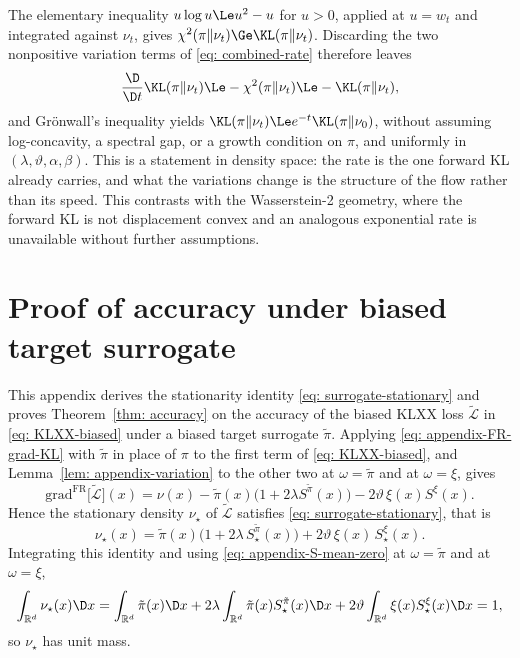 \documentclass{article}
\begin{document}
The elementary inequality $u\log u\Le u^2-u$ for $u>0$, applied at $u=w_t$ and integrated against $\nu_t$, gives $\chi^2(\pi\|\nu_t)\Ge\KL(\pi\|\nu_t)$. Discarding the two nonpositive variation terms of \eqref{eq: combined-rate} therefore leaves
\begin{equation*}
    \frac{\D}{\D t}\KL(\pi\|\nu_t) \Le -\chi^2(\pi\|\nu_t) \Le -\KL(\pi\|\nu_t) ,
\end{equation*}
and Gr\"onwall's inequality yields $\KL(\pi\|\nu_t)\Le e^{-t}\KL(\pi\|\nu_0)$, without assuming log-concavity, a spectral gap, or a growth condition on $\pi$, and uniformly in $(\lambda,\vartheta,\alpha,\beta)$. This is a statement in density space: the rate is the one forward KL already carries, and what the variations change is the structure of the flow rather than its speed. This contrasts with the Wasserstein-2 geometry, where the forward KL is not displacement convex and an analogous exponential rate is unavailable without further assumptions.

\section{Proof of accuracy under biased target surrogate}
\label{sec: appendix-accuracy}

This appendix derives the stationarity identity \eqref{eq: surrogate-stationary} and proves Theorem~\ref{thm: accuracy} on the accuracy of the biased KLXX loss $\tilde{\mathcal L}$ in \eqref{eq: KLXX-biased} under a biased target surrogate $\tilde\pi$. Applying \eqref{eq: appendix-FR-grad-KL} with $\tilde\pi$ in place of $\pi$ to the first term of \eqref{eq: KLXX-biased}, and Lemma~\ref{lem: appendix-variation} to the other two at $\omega=\tilde\pi$ and at $\omega=\xi$, gives
\begin{equation*}
    \mathrm{grad}^{\mathrm{FR}}\bigl[\tilde{\mathcal L}\bigr](x) = \nu(x) - \tilde\pi(x)\bigl(1+2\lambda S^{\tilde\pi}(x)\bigr) - 2\vartheta\,\xi(x)S^{\xi}(x) .
\end{equation*}
Hence the stationary density $\nu_\star$ of $\tilde{\mathcal L}$ satisfies \eqref{eq: surrogate-stationary}, that is
\begin{equation*}
	\nu_\star(x) = \tilde\pi(x)\bigl(1 + 2\lambda\,S^{\tilde\pi}_\star(x)\bigr) + 2\vartheta\,\xi(x)\,S^{\xi}_\star(x) .
\end{equation*}
Integrating this identity and using \eqref{eq: appendix-S-mean-zero} at $\omega=\tilde\pi$ and at $\omega=\xi$,
\begin{equation*}
	\int_{\mathbb R^d} \nu_\star(x)\D x = \int_{\mathbb R^d} \tilde\pi(x)\D x
	+2\lambda\int_{\mathbb R^d} \tilde\pi(x)S^{\tilde\pi}_\star(x)\D x +
	2\vartheta\int_{\mathbb R^d}\xi(x)S^{\xi}_\star(x)\D x = 1 ,
\end{equation*}
so $\nu_\star$ has unit mass.
\end{document}

